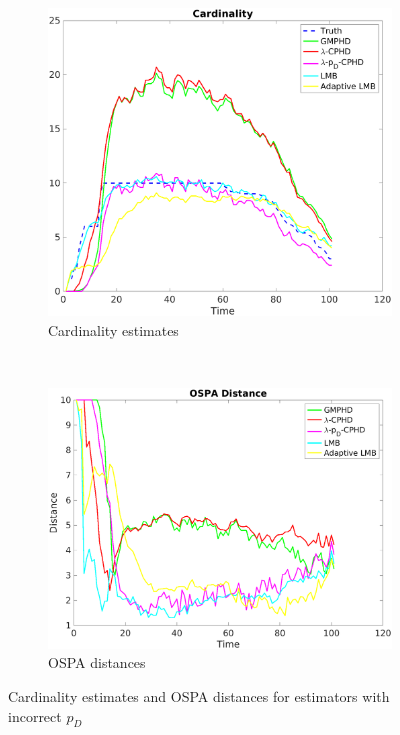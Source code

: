 \documentclass{article}
\begin{document}
\begin{figure}[H]
  \centering
  \begin{subfigure}[t]{0.49\textwidth}
    \centering
    \includegraphics[width=1\linewidth]{low_pd/cardinality.png}
    \caption{Cardinality estimates}
  \end{subfigure}%
  ~ 
  \begin{subfigure}[t]{0.49\textwidth}
    \centering
    \includegraphics[width=1\linewidth]{low_pd/ospa.png}
    \caption{OSPA distances}
  \end{subfigure}
\caption{Cardinality estimates and OSPA distances for estimators with incorrect $p_D$}
\end{figure}
\end{document}
